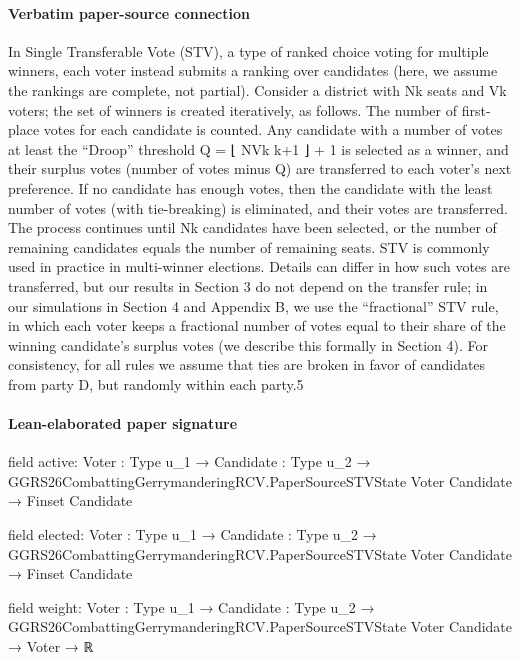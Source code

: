 \documentclass[10pt]{article}
\begin{document}
\paragraph{Verbatim paper-source connection}
\begin{ReviewVerbatim}
In Single Transferable Vote (STV), a type of ranked choice voting for multiple winners, each
voter instead submits a ranking over candidates (here, we assume the rankings are complete, not
partial). Consider a district with Nk seats and Vk voters; the set of winners is created iteratively, as
follows. The number of first-place votes for each candidate is counted. Any candidate with a number
of votes at least the “Droop” threshold Q = ⌊ NVk k+1 ⌋ + 1 is selected as a winner, and their surplus
votes (number of votes minus Q) are transferred to each voter’s next preference. If no candidate has
enough votes, then the candidate with the least number of votes (with tie-breaking) is eliminated,
and their votes are transferred. The process continues until Nk candidates have been selected, or
the number of remaining candidates equals the number of remaining seats. STV is commonly used
in practice in multi-winner elections.
    Details can differ in how such votes are transferred, but our results in Section 3 do not depend
on the transfer rule; in our simulations in Section 4 and Appendix B, we use the “fractional” STV
rule, in which each voter keeps a fractional number of votes equal to their share of the winning
candidate’s surplus votes (we describe this formally in Section 4). For consistency, for all rules we
assume that ties are broken in favor of candidates from party D, but randomly within each party.5
\end{ReviewVerbatim}



\paragraph{Lean-elaborated paper signature}
\begin{ReviewVerbatim}
field active:
{Voter : Type u_1} →
  {Candidate : Type u_2} → GGRS26CombattingGerrymanderingRCV.PaperSourceSTVState Voter Candidate → Finset Candidate

field elected:
{Voter : Type u_1} →
  {Candidate : Type u_2} → GGRS26CombattingGerrymanderingRCV.PaperSourceSTVState Voter Candidate → Finset Candidate

field weight:
{Voter : Type u_1} →
  {Candidate : Type u_2} → GGRS26CombattingGerrymanderingRCV.PaperSourceSTVState Voter Candidate → Voter → ℝ
\end{ReviewVerbatim}
\end{document}

